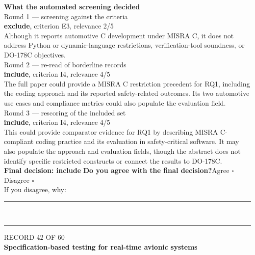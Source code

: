 \documentclass[11pt,a4paper]{article}
\begin{document}
\vspace{3mm}
\vspace{2.5mm}
{\small\textbf{What the automated screening decided}}\\[2mm]
{\footnotesize\color{soft}Round 1 --- screening against the criteria}\\[0.5mm]
{\small\textbf{exclude}, criterion E3, relevance 2/5}\\[0.5mm]
{\small Although it reports automotive C development under MISRA C, it does not address Python or dynamic-language restrictions, verification-tool soundness, or DO-178C objectives.}\\[2.5mm]
{\footnotesize\color{soft}Round 2 --- re-read of borderline records}\\[0.5mm]
{\small\textbf{include}, criterion I4, relevance 4/5}\\[0.5mm]
{\small The full paper could provide a MISRA C restriction precedent for RQ1, including the coding approach and its reported safety-related outcomes. Its two automotive use cases and compliance metrics could also populate the evaluation field.}\\[2.5mm]
{\footnotesize\color{soft}Round 3 --- rescoring of the included set}\\[0.5mm]
{\small\textbf{include}, criterion I4, relevance 4/5}\\[0.5mm]
{\small This could provide comparator evidence for RQ1 by describing MISRA C-compliant coding practice and its evaluation in safety-critical software. It may also populate the approach and evaluation fields, though the abstract does not identify specific restricted constructs or connect the results to DO-178C.}\\[2.5mm]
{\small\textbf{Final decision: include}}
\vspace{2mm}
{\small\textbf{Do you agree with the final decision?}\quad{}Agree $\square$\qquad{}Disagree $\square$}\\[1mm]
{\footnotesize\color{soft}If you disagree, why:}\\[1mm]
\color{rule}\rule{\linewidth}{0.3pt}\\[3mm]\rule{\linewidth}{0.3pt}\color{black}
\clearpage
{\color{soft}\footnotesize RECORD 42 OF 60}\\[1mm]
{\large\bfseries Specification-based testing for real-time avionic systems}\\[1.5mm]
\end{document}
